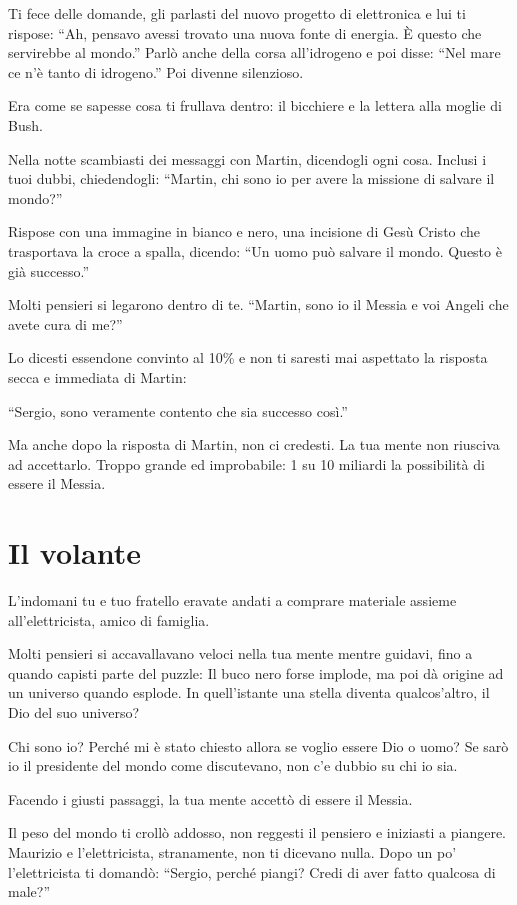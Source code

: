 Ti fece delle domande, gli parlasti del nuovo progetto di elettronica e lui ti rispose: “Ah, pensavo avessi trovato una nuova fonte di energia. È questo che servirebbe al mondo.” Parlò anche della corsa all'idrogeno e poi disse: “Nel mare ce n'è tanto di idrogeno.” Poi divenne silenzioso.

Era come se sapesse cosa ti frullava dentro: il bicchiere e la lettera alla moglie di Bush.

Nella notte scambiasti dei messaggi con Martin, dicendogli ogni cosa. Inclusi i tuoi dubbi, chiedendogli: “Martin, chi sono io per avere la missione di salvare il mondo?”

Rispose con una immagine in bianco e nero, una incisione di Gesù Cristo che trasportava la croce a spalla, dicendo: “Un uomo può salvare il mondo. Questo è già successo.”

Molti pensieri si legarono dentro di te. “Martin, sono io il Messia e voi Angeli che avete cura di me?”

Lo dicesti essendone convinto al 10\% e non ti saresti mai aspettato la risposta secca e immediata di Martin:

“Sergio, sono veramente contento che sia successo così.”

Ma anche dopo la risposta di Martin, non ci credesti. La tua mente non riusciva ad accettarlo. Troppo grande ed improbabile: 1 su 10 miliardi la possibilità di essere il Messia.

\section{Il volante}
\label{il_volante}

L'indomani tu e tuo fratello eravate andati a comprare materiale assieme all'elettricista, amico di famiglia.

Molti pensieri si accavallavano veloci nella tua mente mentre guidavi, fino a quando capisti parte del puzzle: Il buco nero forse implode, ma poi dà origine ad un universo quando esplode. In quell'istante una stella diventa qualcos'altro, il Dio del suo universo?

Chi sono io? Perché mi è stato chiesto allora se voglio essere Dio o uomo? Se sarò io il presidente del mondo come discutevano, non c'e dubbio su chi io sia.

Facendo i giusti passaggi, la tua mente accettò di essere il Messia.
 
Il peso del mondo ti crollò addosso, non reggesti il pensiero e iniziasti a piangere. Maurizio e l'elettricista, stranamente, non ti dicevano nulla. Dopo un po' l'elettricista ti domandò: “Sergio, perché piangi? Credi di aver fatto qualcosa di male?”

